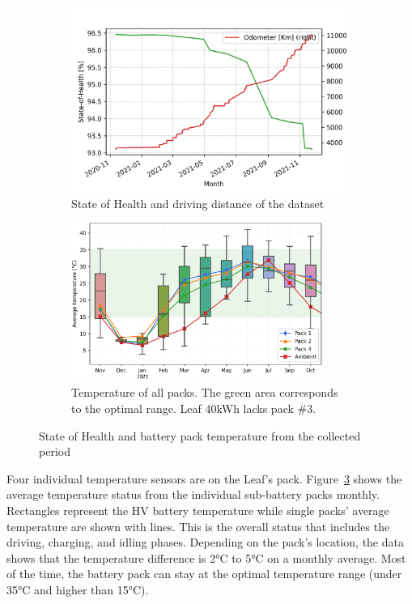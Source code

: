 \begin{figure} [htbp]
	\centering
	\begin{subfigure}{0.47\linewidth}
        \includegraphics[width=\textwidth]{Chapter5/figures/ch5_SOH_Odometer_colored.png} 
        \caption{State of Health and driving distance of the dataset}
        \label{fig:soh_odometer}
	\end{subfigure}
	\quad
    \begin{subfigure}{0.43\linewidth}
        \includegraphics[width=0.9\textwidth]{Chapter5/figures/BAT_SEASONAL_PACK_MEAN.png}
        \caption{Temperature of all packs. The green area corresponds to the optimal range. Leaf 40kWh lacks pack \#3.}
        \label{fig:avg_pack_temp}
	\end{subfigure}
    \caption{State of Health and battery pack temperature from the collected period}
\end{figure}

Four individual temperature sensors are on the Leaf's pack. 
Figure~\ref{fig:avg_pack_temp} shows the average temperature status from the individual sub-battery packs monthly. 
Rectangles represent the \gls{HV} battery temperature while single packs' average temperature are shown with lines. 
This is the overall status that includes the driving, charging, and idling phases. 
Depending on the pack's location, the data shows that the temperature difference is 2°C to 5°C on a monthly average. 
Most of the time, the battery pack can stay at the optimal temperature range (under 35°C and higher than 15°C).



